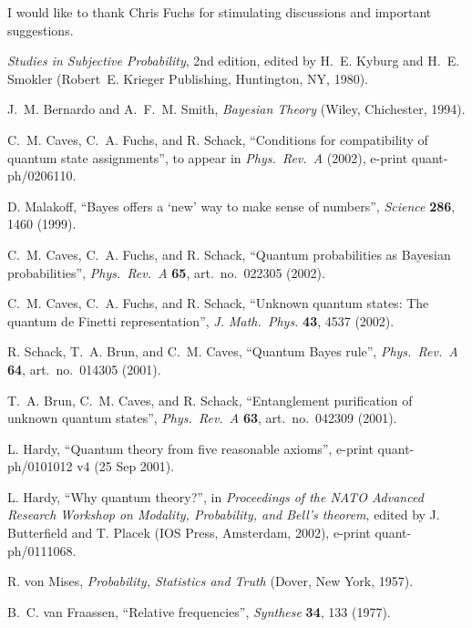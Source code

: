 \documentclass[pra,12pt,tightenlines]{revtex4}
\begin{document}
I would like to thank Chris Fuchs for stimulating discussions and 
important suggestions. 

%
%

\begin{thebibliography}{10}

{\em Studies in Subjective Probability}, 2nd edition, 
edited by H.~E. Kyburg and H.~E. Smokler 
(Robert~E. Krieger Publishing, Huntington, NY, 1980).

J.~M. Bernardo and A.~F.~M. Smith, {\em Bayesian Theory\/} (Wiley, Chichester,
  1994).

C.~M. Caves, C.~A. Fuchs, and R. Schack, 
``Conditions for compatibility of quantum state assignments'',
to appear in {\it Phys.\ Rev.\ A\/} (2002), e-print quant-ph/0206110.

D. Malakoff, ``Bayes offers a `new' way to make sense of numbers'',
{\it Science\/} {\bf 286},  1460  (1999).

C.~M. Caves, C.~A. Fuchs, and R. Schack, 
``Quantum probabilities as Bayesian probabilities'',
{\it Phys.\ Rev.\ A\/} {\bf 65},
  art.~no.~022305 (2002).

C.~M. Caves, C.~A. Fuchs, and R. Schack, 
``Unknown quantum states: The quantum de Finetti representation'',
{\it J. Math.\ Phys.} {\bf 43},  4537 (2002).

R. Schack, T.~A. Brun, and C.~M. Caves, 
``Quantum Bayes rule'',
{\it Phys.\ Rev.\ A\/} {\bf 64},  art.~no.~014305 (2001).

T.~A. Brun, C.~M. Caves, and R. Schack, 
``Entanglement purification of unknown quantum states'',
{\it Phys.\ Rev.\ A\/} {\bf 63},  art.~no.~042309 (2001).

L. Hardy, ``Quantum theory from five reasonable axioms'', 
e-print quant-ph/0101012 v4 (25 Sep 2001).

L. Hardy, ``Why quantum theory?'',
in {\em Proceedings of the NATO Advanced Research Workshop on
  Modality, Probability, and Bell's theorem}, edited by J. Butterfield and T.
  Placek (IOS Press, Amsterdam, 2002), e-print quant-ph/0111068.

R. von Mises, {\em Probability, Statistics and Truth\/} 
(Dover, New York, 1957).

B.~C. van Fraassen, 
``Relative frequencies'', {\it Synthese\/} {\bf 34},  133  (1977).


\end{thebibliography}
\end{document}

